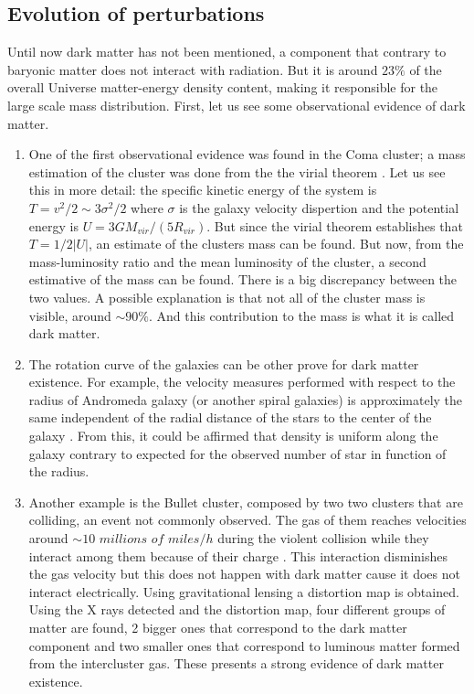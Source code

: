 \subsection{ Evolution of perturbations }

Until now dark matter has not been mentioned, a component that contrary
to baryonic matter does not interact with radiation. But it is around
$23\%$ of the overall Universe matter-energy density content, making it responsible for the 
large scale mass distribution. First, let us see some observational evidence of dark matter. 

\begin{enumerate}

\item One of the first observational evidence was found in the Coma cluster;
a mass estimation of the cluster was done from the the virial theorem \cite{Zwicky}. 
Let us see this in more detail: 
the specific kinetic energy of the system is $T = v^2/2 \sim 3\sigma^2/2 $ 
where $\sigma$ is the galaxy velocity dispertion and the potential energy
is $U = 3GM_{vir}/(5R_{vir})$. But since the virial theorem establishes that
$T = 1/2|U|$, an estimate of the clusters mass can be found. 
But now, from the mass-luminosity ratio and the mean luminosity of the cluster, 
a second estimative of the mass can be found. There is
a big discrepancy between the two values. A possible explanation is that 
not all of the cluster mass is visible, around $\sim 90\%$. And this 
contribution to the mass is what it is called dark matter. 

\item The rotation curve of the galaxies can be other prove for dark matter existence.
For example, the velocity measures performed with respect to the radius of Andromeda 
galaxy (or another spiral galaxies) is approximately the same independent of the radial
distance of the stars to the center of the galaxy \cite{Jog}. From this, it could be affirmed that
density is uniform along the galaxy contrary to expected for the observed 
number of star in function of the radius. 


\item Another example is the Bullet cluster, composed by two two clusters that are colliding, 
an event not commonly observed. The gas of them reaches velocities around $\sim 10$ $millions$ $of$ $miles/h$ during the violent collision while they interact among them because of their charge
\cite{bullet}. 
This interaction disminishes the gas velocity but this does not happen with dark
matter cause it does not interact electrically. 
Using gravitational lensing a distortion map is obtained. Using the X rays detected
and the distortion map, four different groups of matter are found, 2 bigger ones
that correspond to the dark matter component and two smaller ones that correspond
to luminous matter formed from the intercluster gas. These presents a strong
evidence of dark matter existence. 

\end{enumerate}

